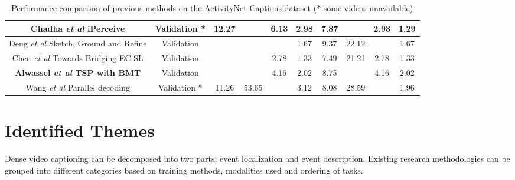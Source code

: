 \begin{table}[]
\begin{tabular}{|c|c|cccc|cccc|}
		Chadha \textit{et al} \cite{chadha2020iperceive} iPerceive                         & Validation *                  & \multicolumn{1}{c|}{12.27}      & \multicolumn{1}{c|}{}           & \multicolumn{1}{c|}{6.13}         & 2.98                  & \multicolumn{1}{c|}{7.87}       & \multicolumn{1}{l|}{}           & \multicolumn{1}{c|}{2.93}         & 1.29         \\ \hline
		Deng \textit{et al} \cite{deng2021sketch} Sketch, Ground and Refine           & Validation                    & \multicolumn{1}{c|}{}           & \multicolumn{1}{c|}{}           & \multicolumn{1}{l|}{}             & 1.67                  & \multicolumn{1}{c|}{9.37}       & \multicolumn{1}{c|}{22.12}      & \multicolumn{1}{c|}{}             & 1.67         \\ \hline
		Chen \textit{et al} \cite{chen2021towards} Towards Bridging EC-SL              & Validation                    & \multicolumn{1}{c|}{}           & \multicolumn{1}{c|}{}           & \multicolumn{1}{c|}{2.78}         & 1.33                  & \multicolumn{1}{c|}{7.49}       & \multicolumn{1}{c|}{21.21}      & \multicolumn{1}{c|}{2.78}         & 1.33         \\ \hline
		\textbf{Alwassel \textit{et al} \cite{alwassel2021tsp} TSP with BMT}           & Validation                    & \multicolumn{1}{c|}{}           & \multicolumn{1}{c|}{}           & \multicolumn{1}{c|}{4.16}         & 2.02                  & \multicolumn{1}{c|}{8.75}       & \multicolumn{1}{l|}{}           & \multicolumn{1}{c|}{4.16}         & 2.02         \\ \hline
		Wang \textit{et al} \cite{wang2021endtoend} Parallel decoding                   & Validation *                  & \multicolumn{1}{c|}{11.26}      & \multicolumn{1}{c|}{53.65}      & \multicolumn{1}{l|}{}             & 3.12                  & \multicolumn{1}{c|}{8.08}       & \multicolumn{1}{c|}{28.59}      & \multicolumn{1}{c|}{}             & 1.96         \\ \hline
	\end{tabular}

\centering
\caption{Performance comparison of previous methods on the ActivityNet Captions dataset (* some videos unavailable)}  \label{tab: performance-comparison}

\end{table}

\section{Identified Themes}
\par Dense video captioning can be decomposed into two parts: event localization and event description. Existing research methodologies can be grouped into different categories based on training methods, modalities used and ordering of tasks.

